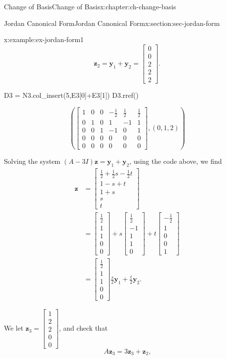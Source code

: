 \documentclass[oneside,10pt,]{book}
\numberwithin{equation}{section}
\newcommand{\bbm}{\begin{bmatrix}}
\newcommand{\ebm}{\end{bmatrix}}
\newcommand{\zz}{\mathbf{z}}
\newcommand{\yy}{\mathbf{y}}
\newcommand{\amp}{&}
\begin{document}
\begin{chapterptx}{Change of Basis}{}{Change of Basis}{}{}{x:chapter:ch-change-basis}
\begin{sectionptx}{Jordan Canonical Form}{}{Jordan Canonical Form}{}{}{x:section:sec-jordan-form}
\begin{example}{}{x:example:ex-jordan-form1}
\begin{equation*}
\zz_2 = \yy_1+\yy_2 = \bbm 0\\0\\2\\2\\2\ebm\text{.}
\end{equation*}
%
\begin{sageinput}
D3 = N3.col_insert(5,E3[0]+E3[1])
D3.rref()
\end{sageinput}
\begin{sageoutput}
\[\left(\bbm 1\amp 0\amp 0\amp -\frac12\amp \frac12\amp \frac12\\
0\amp 1\amp 0\amp 1\amp -1 \amp 1\\0\amp 0\amp 1\amp -1\amp 0\amp 1\\
0\amp 0\amp 0\amp 0\amp 0\amp 0\\0\amp 0\amp 0\amp 0\amp 0\amp 0\ebm,(0,1,2)\right)\]
\end{sageoutput}
Solving the system \((A-3I)\zz = \yy_1+\yy_2\), using the code above, we find%
\begin{align*}
\zz \amp = \bbm \frac12 +\frac12 s-\frac12 t\\1-s+t\\1+s\\s\\t\ebm\\
\amp = \bbm \frac12\\1\\1\\0\\0\ebm + s\bbm\frac12\\-1\\1\\1\\0\ebm+t\bbm -\frac12\\1\\0\\0\\1\ebm\\
\amp = \bbm \frac12\\1\\1\\0\\0\ebm \frac{s}{2}\yy_1+\frac{t}{2}\yy_2\text{.}
\end{align*}
%
\par
We let \(\zz_3 = \bbm 1 \\ 2 \\ 2 \\ 0 \\ 0\ebm\), and check that%
\begin{equation*}
A\zz_3 = 3\zz_3+\zz_2\text{,}

\end{equation*}
\end{example}
\end{sectionptx}
\end{chapterptx}
\end{document}
